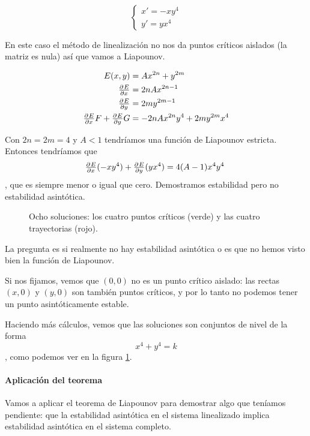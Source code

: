 \begin{example} \[\begin{cases} x' = -xy^4 \\ y'=yx^4 \end{cases} \]

En este caso el método de linealización no nos da puntos críticos aislados (la matriz es nula) así que vamos a Liapounov.

\begin{align*}
E(x,y) &= Ax^{2n} + y^{2m} \\
\pd{E}{x} &= 2n Ax^{2n-1} \\
\pd{E}{y} &= 2my^{2m-1} \\
\pd{E}{x}F + \pd{E}{y}G &= -2nAx^{2n}y^4 + 2my^{2m}x^4
\end{align*}

Con $2n=2m=4$ y $A<1$ tendríamos una función de Liapounov estricta. Entonces tendríamos que \[ \pd{E}{x}(-xy^4) + \pd{E}{y}(yx^4) = 4(A-1)x^4y^4 \], que es siempre menor o igual que cero. Demostramos estabilidad pero no estabilidad asintótica.

\begin{figure}
\label{img8-Ej3}
\caption{Ocho soluciones: los cuatro puntos críticos (verde) y las cuatro trayectorias (rojo).}
\end{figure}

La pregunta es si realmente no hay estabilidad asintótica o es que no hemos visto bien la función de Liapounov.

Si nos fijamos, vemos que $(0,0)$ no es un punto crítico aislado: las rectas $(x,0)$ y $(y,0)$ son también puntos críticos, y por lo tanto no podemos tener un punto asintóticamente estable.

Haciendo más cálculos, vemos que las soluciones son conjuntos de nivel de la forma \[ x^4 + y^4 = k \], como podemos ver en la figura \ref{img8-Ej3}.
\end{example}


\paragraph{Aplicación del teorema} Vamos a aplicar el teorema de Liapounov para demostrar algo que teníamos pendiente: que la estabilidad asintótica en el sistema linealizado implica estabilidad asintótica en el sistema completo.

